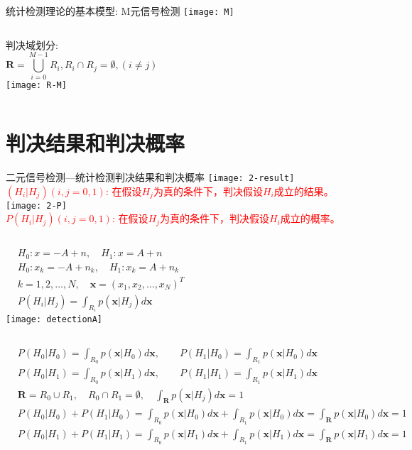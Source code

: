 \begin{frame}{统计检测理论的基本模型: M元信号检测}
\texttt{[image: M]}
\newline
\begin{columns}
    判决域划分:
    \[\bm{R}=\bigcup_{i=0}^{M-1}R_i, R_i\cap R_j=\emptyset, (i\ne j) \]
	\texttt{[image: R-M]}
\end{columns}
\end{frame}

\section{判决结果和判决概率}

\begin{frame}{二元信号检测---统计检测判决结果和判决概率}
\texttt{[image: 2-result]}\\
\textcolor{red}{$(H_i|H_j)(i,j=0,1)$: 在假设$H_j$为真的条件下，判决假设$H_i$成立的结果。}
\newline
\texttt{[image: 2-P]}\\
\textcolor{red}{$P(H_i|H_j)(i,j=0,1)$: 在假设$H_j$为真的条件下，判决假设$H_i$成立的概率。}
\end{frame}

\begin{frame}
\begin{columns}
	\begin{align*}
	&H_0: x=-A+n,\quad H_1: x=A+n\\
	&H_0: x_k=-A+n_k,\quad H_1: x_k=A+n_k\\
	&k=1,2,\dots,N,\quad \bm{x}=(x_1,x_2,\dots,x_N)^{T}\\
	&P(H_i|H_j)=\int_{R_i}p(\bm{x}|H_j)d\bm{x}
	\end{align*}
	\texttt{[image: detectionA]}
\end{columns}
\begin{align*}
&P(H_0|H_0)=\int_{R_0}p(\bm{x}|H_0)d\bm{x},\qquad P(H_1|H_0)=\int_{R_1}p(\bm{x}|H_0)d\bm{x}\\
&P(H_0|H_1)=\int_{R_0}p(\bm{x}|H_1)d\bm{x},\qquad P(H_1|H_1)=\int_{R_1}p(\bm{x}|H_1)d\bm{x}\\
&\bm{R}=R_0\cup R_1,\quad R_0\cap R_1=\emptyset, \quad \int_{\bm{R}}p(\bm{x}|H_j)d\bm{x}=1\\
&P(H_0|H_0)+P(H_1|H_0)=\int_{R_0}p(\bm{x}|H_0)d\bm{x}+\int_{R_1}p(\bm{x}|H_0)d\bm{x}=\int_{\bm{R}}p(\bm{x}|H_0)d\bm{x}=1\\
&P(H_0|H_1)+P(H_1|H_1)=\int_{R_0}p(\bm{x}|H_1)d\bm{x}+\int_{R_1}p(\bm{x}|H_1)d\bm{x}=\int_{\bm{R}}p(\bm{x}|H_1)d\bm{x}=1
\end{align*}
\end{frame}

